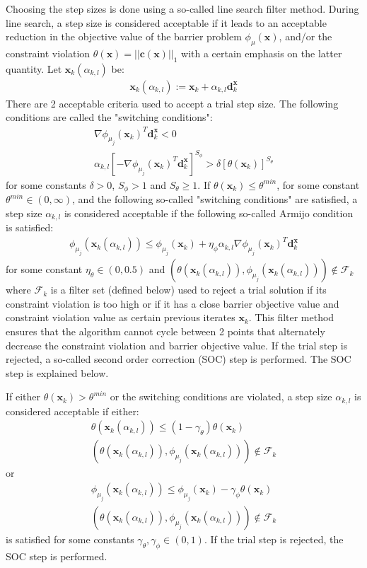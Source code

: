   Choosing the step sizes is done using a so-called line search filter method. During line search, a step size is considered acceptable if it leads to an acceptable reduction in the objective value of the barrier problem $\phi_{\mu}(\bm{x})$, and/or the constraint violation $\theta(\bm{x}) =  ||\bm{c}(\bm{x})||_1$ with a certain emphasis on the latter quantity. Let $\bm{x}_k(\alpha_{k,l})$ be:
  \begin{align}
      \bm{x}_k(\alpha_{k,l}) := \bm{x}_k + \alpha_{k,l} \bm{d}_k^{\bm{x}}
  \end{align}
  There are 2 acceptable criteria used to accept a trial step size. The following conditions are called the "switching conditions":
  \begin{align}
      \nabla \phi_{\mu_j}(\bm{x}_k)^T \bm{d}_k^{\bm{x}} < 0 \\
      \alpha_{k,l}[-\nabla \phi_{\mu_j}(\bm{x}_k)^T \bm{d}_k^{\bm{x}}]^{S_\phi} > \delta [\theta(\bm{x}_k)]^{S_{\theta}}
  \end{align}
  for some constants $\delta > 0$, $S_{\phi} > 1$ and $S_{\theta} \geq 1$. If $\theta(\bm{x}_k) \leq \theta^{min}$, for some constant $\theta^{min} \in (0, \infty)$, and the following so-called "switching conditions" are satisfied, a step size $\alpha_{k,l}$ is considered acceptable if the following so-called Armijo condition is satisfied:
  \begin{align}
      \phi_{\mu_j}(\bm{x}_k(\alpha_{k,l})) \leq \phi_{\mu_j}(\bm{x}_k) + \eta_{\phi} \alpha_{k,l} \nabla \phi_{\mu_j}(\bm{x}_k)^T \bm{d}_k^{\bm{x}}
  \end{align}
  for some constant $\eta_{\theta} \in (0, 0.5)$ and $(\theta(\bm{x}_k(\alpha_{k,l})), \phi_{\mu_j}(\bm{x}_k(\alpha_{k,l}))) \notin \mathcal{F}_k$ where $\mathcal{F}_k$ is a filter set (defined below) used to reject a trial solution if its constraint violation is too high or if it has a close barrier objective value and constraint violation value as certain previous iterates $\bm{x}_k$. This filter method ensures that the algorithm cannot cycle between 2 points that alternately decrease the constraint violation and barrier objective value.  If the trial step is rejected, a so-called second order correction (SOC) step is performed. The SOC step is explained below.
  
  If either $\theta(\bm{x}_k) > \theta^{min}$ or the switching conditions are violated, a step size $\alpha_{k,l}$ is considered acceptable if either:
  \begin{align}
      \theta(\bm{x}_k(\alpha_{k,l})) \leq (1 - \gamma_{\theta}) \theta(\bm{x}_k) \\
      (\theta(\bm{x}_k(\alpha_{k,l})), \phi_{\mu_j}(\bm{x}_k(\alpha_{k,l}))) \notin \mathcal{F}_k
  \end{align}
  or
  \begin{align}
      \phi_{\mu_j}(\bm{x}_k(\alpha_{k,l})) \leq \phi_{\mu_j}(\bm{x}_k) - \gamma_{\phi} \theta(\bm{x}_k) \\
      (\theta(\bm{x}_k(\alpha_{k,l})), \phi_{\mu_j}(\bm{x}_k(\alpha_{k,l}))) \notin \mathcal{F}_k
  \end{align}
  is satisfied for some constants $\gamma_{\theta}, \gamma_{\phi} \in (0, 1)$. If the trial step is rejected, the SOC step is performed.
  
